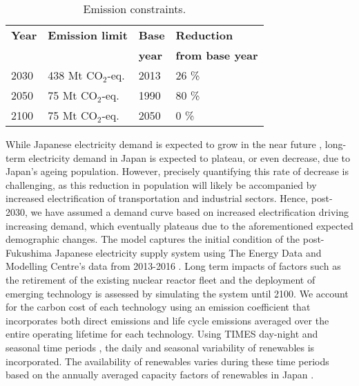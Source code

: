 \begin{table}[H]
\centering
	\caption{Emission constraints.}
	\vspace{0.1in}
	\begin{tabularx}{0.6\textwidth}{p{} p{}p{} p{}}
		\hline
\textbf{Year} & \textbf{Emission limit} & \textbf{Base} & \textbf{Reduction} \\
 & & \textbf{year} & \textbf{from base year} \\
\hline
2030 & 438 Mt CO$_2$-eq. & 2013 & 26 \% \\
2050 & 75 Mt CO$_2$-eq. & 1990 & 80 \% \\
2100 & 75 Mt CO$_2$-eq. & 2050 & 0 \% \\
\hline 
	\end{tabularx}
\label{co2-limits}
\end{table}

While Japanese electricity demand is expected to grow in the near future  \cite{noauthor_electricity_2019}, long-term electricity demand in Japan is expected to plateau, or even decrease, due to Japan's ageing population. However, precisely quantifying this rate of decrease is challenging, as this reduction in population will likely be accompanied by increased electrification of transportation and industrial sectors. Hence, post-2030, we have assumed a demand curve based on increased electrification driving increasing demand, which eventually plateaus due to the aforementioned expected demographic changes. The model captures the initial condition of the post-Fukushima Japanese electricity supply system using The Energy Data and Modelling Centre's data from 2013-2016 \cite{the_institute_of_energy_economics_japan_energy_2018}. Long term impacts of factors such as the retirement of the existing nuclear reactor fleet and the deployment of emerging technology is assessed by simulating the system until 2100. We account for the carbon cost of each technology using an emission coefficient that incorporates both direct emissions and life cycle emissions averaged over the entire operating lifetime for each technology. Using \gls{TIMES} day-night and seasonal time periods \cite{loulou_etsap-tiam_2008}, the daily and seasonal variability of renewables is incorporated. The availability of renewables varies during these time periods based on the annually averaged capacity factors of renewables in Japan \cite{the_institute_of_energy_economics_japan_energy_2018, irena_renewable_2020}.

